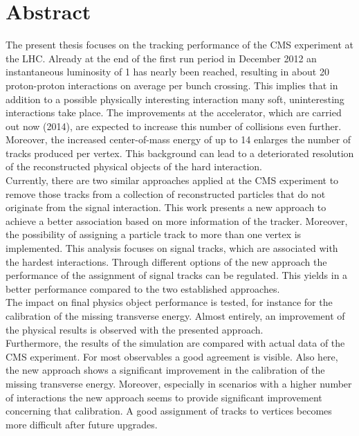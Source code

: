 \chapter*{Abstract}

The present thesis focuses on the tracking performance of the CMS experiment at the LHC. Already at the end of the first run period in December 2012 an instantaneous luminosity of 1\percms{} has nearly been reached, resulting in about 20 proton-proton interactions on average per bunch crossing. This implies that in addition to a possible physically interesting interaction many soft, uninteresting interactions take place. The improvements at the accelerator, which are carried out now (2014), are expected to increase this number of collisions even further. Moreover, the increased center-of-mass energy of up to 14\TeV{} enlarges the number of tracks produced per vertex. This background can lead to a deteriorated resolution of the reconstructed physical objects of the hard interaction.\\
Currently, there are two similar approaches applied at the CMS experiment to remove those tracks from a collection of reconstructed particles that do not originate from the signal interaction. This work presents a new approach to achieve a better association based on more information of the tracker. Moreover, the possibility of assigning a particle track to more than one vertex is implemented. This analysis focuses on signal tracks, which are associated with the hardest interactions. Through different options of the new approach the performance of the assignment of signal tracks can be regulated. This yields in a better performance compared to the two established approaches. \\
The impact on final physics object performance is tested, for instance for the calibration of the missing transverse energy. Almost entirely, an improvement of the physical results is observed with the presented approach. \\
Furthermore, the results of the simulation are compared with actual data of the CMS experiment. For most observables a good agreement is visible. Also here, the new approach shows a significant improvement in the calibration of the missing transverse energy. Moreover, especially in scenarios with a higher number of interactions the new approach seems to provide significant improvement concerning that calibration. A good assignment of tracks to vertices becomes more difficult after future upgrades.
